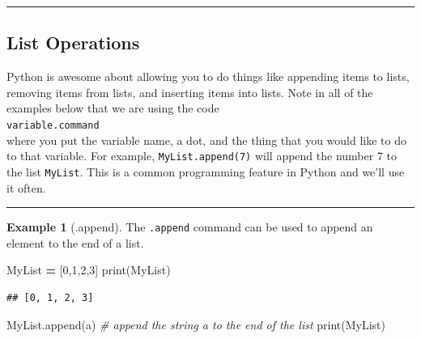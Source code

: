 \documentclass[
]{book}
\newenvironment{Shaded}{\begin{snugshade}}{\end{snugshade}}
\newcommand{\BuiltInTok}[1]{#1}
\newcommand{\CommentTok}[1]{\textcolor[rgb]{0.56,0.35,0.01}{\textit{#1}}}
\newcommand{\DecValTok}[1]{\textcolor[rgb]{0.00,0.00,0.81}{#1}}
\newcommand{\NormalTok}[1]{#1}
\newcommand{\OperatorTok}[1]{\textcolor[rgb]{0.81,0.36,0.00}{\textbf{#1}}}
\newcommand{\StringTok}[1]{\textcolor[rgb]{0.31,0.60,0.02}{#1}}
\theoremstyle{definition}
\theoremstyle{definition}
\newtheorem{example}{Example}[chapter]
\theoremstyle{definition}
\theoremstyle{remark}
\begin{document}
\begin{center}\rule{0.5\linewidth}{0.5pt}\end{center}

\hypertarget{list-operations}{%
\subsection{List Operations}\label{list-operations}}

Python is awesome about allowing you to do things like appending items to lists, removing items from lists, and inserting items into lists. Note in all of the examples below that we are using the code\\
\texttt{variable.command}~\\
where you put the variable name, a dot, and the thing that you would like to do to that variable. For example, \texttt{MyList.append(7)} will append the number 7 to the list \texttt{MyList}. This is a common programming feature in Python and we'll use it often.

\begin{center}\rule{0.5\linewidth}{0.5pt}\end{center}

\begin{example}[.append]
\protect\hypertarget{exm:unnamed-chunk-645}{}{\label{exm:unnamed-chunk-645} {} }The \texttt{.append} command can be used to append an element to the end of a list.
\end{example}

\begin{Shaded}
\begin{Highlighting}[]
\NormalTok{MyList }\OperatorTok{=}\NormalTok{ [}\DecValTok{0}\NormalTok{,}\DecValTok{1}\NormalTok{,}\DecValTok{2}\NormalTok{,}\DecValTok{3}\NormalTok{]}
\BuiltInTok{print}\NormalTok{(MyList)}
\end{Highlighting}
\end{Shaded}

\begin{verbatim}
## [0, 1, 2, 3]
\end{verbatim}

\begin{Shaded}
\begin{Highlighting}[]
\NormalTok{MyList.append(}\StringTok{\textquotesingle{}a\textquotesingle{}}\NormalTok{) }\CommentTok{\# append the string \textquotesingle{}a\textquotesingle{} to the end of the list}
\BuiltInTok{print}\NormalTok{(MyList)}
\end{Highlighting}
\end{Shaded}
\end{document}
